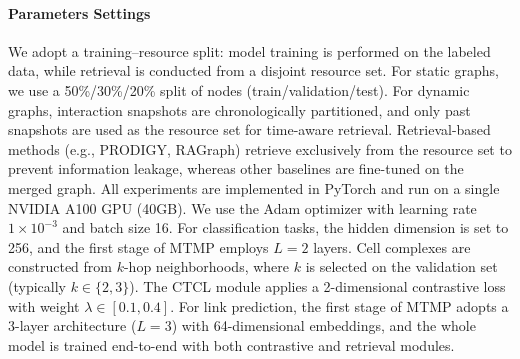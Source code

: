 \paragraph{Parameters Settings}
We adopt a training–resource split: model training is performed on the labeled
data, while retrieval is conducted from a disjoint resource set.
For static graphs, we use a 50\%/30\%/20\%
split of nodes (train/validation/test).
For dynamic graphs, interaction snapshots are chronologically partitioned, and
only past snapshots are used as the resource set for time-aware retrieval.
Retrieval-based methods (e.g., PRODIGY, RAGraph) retrieve exclusively from
the resource set to prevent information leakage, whereas other baselines are
fine-tuned on the merged graph.
All experiments are implemented in PyTorch and run on a single NVIDIA A100
GPU (40GB).
We use the Adam optimizer with learning rate $1\times10^{-3}$ and batch size 16.
For classification tasks, the hidden dimension is set to 256, and the first stage
of MTMP employs $L=2$ layers.
Cell complexes are constructed from $k$-hop neighborhoods, where $k$ is
selected on the validation set (typically $k\in\{2,3\}$).
The CTCL module applies a 2-dimensional contrastive loss with weight
$\lambda\in[0.1,0.4]$.
For link prediction, the first stage of MTMP adopts a 3-layer architecture
($L=3$) with 64-dimensional embeddings, and the whole model is trained
end-to-end with both contrastive and retrieval modules.

